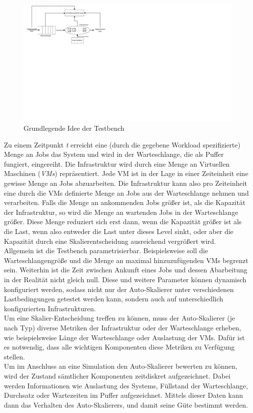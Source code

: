 \begin{figure}[!h]
	\includegraphics[width=\textwidth, trim={1cm 13cm 20cm 0cm}]{img/BasicIdea.pdf}
	\caption{Grundlegende Idee der Testbench}
	\label{fig:BasicIdea}
\end{figure}

\noindent
Zu einem Zeitpunkt \textit{t} erreicht eine (durch die gegebene Workload spezifizierte) Menge an Jobs das System und wird in der Warteschlange, die als Puffer fungiert, eingereiht. Die Infrastruktur wird durch eine Menge an Virtuellen Maschinen (\textit{VMs}) repräsentiert. Jede VM ist in der Lage in einer Zeiteinheit eine gewisse Menge an Jobs abzuarbeiten. Die Infrastruktur kann also pro Zeiteinheit eine durch die VMs definierte Menge an Jobs aus der Warteschlange nehmen und verarbeiten. Falls die Menge an ankommenden Jobs größer ist, als die Kapazität der Infrastruktur, so wird die Menge an wartenden Jobs in der Warteschlange größer. Diese Menge reduziert sich erst dann, wenn die Kapazität größer ist als die Last, wenn also entweder die Last unter dieses Level sinkt, oder aber die Kapazität durch eine Skalierentscheidung ausreichend vergrößert wird.\\
Allgemein ist die Testbench parametrisierbar. Beispielsweise soll die Warteschlangengröße und die Menge an maximal hinzuzufügenden VMs begrenzt sein. Weiterhin ist die Zeit zwischen Ankunft eines Jobs und dessen Abarbeitung in der Realität nicht gleich null. Diese und weitere Parameter können dynamisch konfiguriert werden, sodass nicht nur der Auto-Skalierer unter verschiedenen Lastbedingungen getestet werden kann, sondern auch auf unterschiedlich konfigurierten Infrastrukturen. \\
Um eine Skalier-Entscheidung treffen zu können, muss der Auto-Skalierer (je nach Typ) diverse Metriken der Infrastruktur oder der Warteschlange erheben, wie beispielsweise Länge der Warteschlange oder Auslastung der VMs. Dafür ist es notwendig, dass alle wichtigen Komponenten diese Metriken zu Verfügung stellen. \\
Um im Anschluss an eine Simulation den Auto-Skalierer bewerten zu können, wird der Zustand sämtlicher Komponenten zeitdiskret aufgezeichnet. Dabei werden Informationen wie Auslastung des Systems, Füllstand der Warteschlange, Durchsatz oder Wartezeiten im Puffer aufgezeichnet. Mittels dieser Daten kann dann das Verhalten des Auto-Skalierers, und damit seine Güte bestimmt werden.

